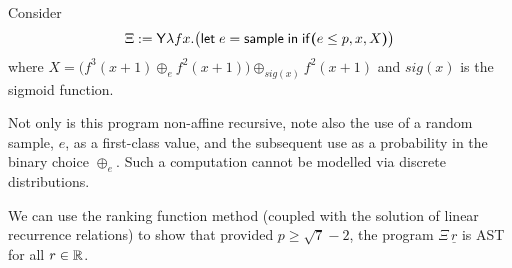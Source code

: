 
\begin{example}
\label{ex:non-affine with continuous distribution}
Consider 
\[
\Xi := \mathsf{Y} \lambda f x . \big(\mathsf{let} \; e = \mathsf{sample} \; \mathsf{in} \;
\mathsf{if}\boldsymbol{(}e \leq p, x, X\boldsymbol{)}\big)
\]
where
\(
X = \big( f^3(x+1) \oplus_e f^2(x+1) \big) \oplus_{\mathit{sig}(x)} f^2(x+1) 
\)
and $\mathit{sig}(x)$ is the sigmoid function.

Not only is this program non-affine recursive,
note also the use of a random sample, $e$, as a first-class value, and the subsequent use as a probability in the binary choice $\oplus_e$.
Such a computation cannot be modelled via discrete distributions. 

We can use the ranking function method (coupled with the solution of linear recurrence relations) to show that provided $p \geq \sqrt{7} - 2$, the program $\Xi \, \underline r$ is AST for all $r \in \mathbb{R}$.

\end{example}


\iffalse
\[\begin{array}{l}
\mathsf{let} \; \mathit{add} \; x \; y = x + y \\
\mathsf{letrec} \; \mathit{iter} \; f \; s \; n = 
\tif{n \leq 0}{s}{f \; n \; (\mathit{iter} \; f \; s \; (n - 1)}
\end{array}
\]
\fi


